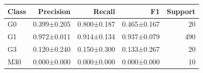 \begin{tabular}{lrrrr}
\toprule
Class & Precision & Recall & F1 & Support \\
\midrule
G0 & 0.399±0.205 & 0.800±0.187 & 0.465±0.167 & 20 \\
G1 & 0.972±0.011 & 0.914±0.134 & 0.937±0.079 & 490 \\
G3 & 0.120±0.240 & 0.150±0.300 & 0.133±0.267 & 20 \\
M30 & 0.000±0.000 & 0.000±0.000 & 0.000±0.000 & 10 \\
\bottomrule
\end{tabular}
